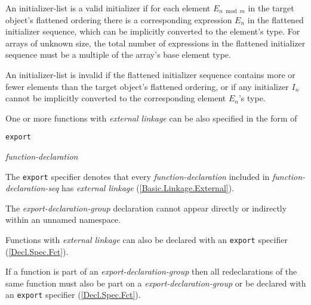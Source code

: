 \p An initializer-list is a valid initializer if for each element
\(E_{n \bmod m}\) in the target object's flattened ordering there is a
corresponding expression \(E_n\) in the flattened initializer sequence, which
can be implicitly converted to the element's type. For arrays of unknown size,
the total number of expressions in the flattened initializer sequence must be a
multiple of the array's base element type.

\p An initializer-list is invalid if the flattened initializer sequence contains
more or fewer elements than the target object's flattened ordering, or if any
initializer \(I_n\) cannot be implicitly converted to the corresponding element
\(E_n\)'s type.



\p One or more functions with \textit{external linkage} can be also specified in the form of

\begin{grammar}
  \br
  \texttt{export} \terminal{\{}  \terminal{\}}\br

  \br
  \textit{function-declaration} 
\end{grammar}

\p The \texttt{export} specifier denotes that every \textit{function-declaration} included in \textit{function-declaration-seq} has \textit{external linkage} (\ref{Basic.Linkage.External}).

\p The \textit{export-declaration-group} declaration cannot appear directly or indirectly within an unnamed namespace.

\p Functions with \textit{external linkage} can also be declared with an \texttt{export} specifier (\ref{Decl.Spec.Fct}).

\p If a function is part of an \textit{export-declaration-group} then all redeclarations of the same function must also be part on a \textit{export-declaration-group} or be declared with an \texttt{export} specifier (\ref{Decl.Spec.Fct}).
